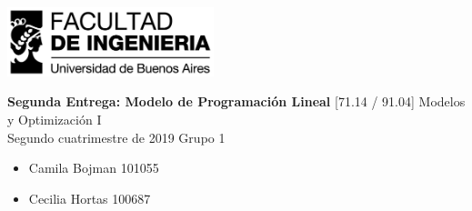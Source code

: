 \documentclass[a4paper]{article}
\newcommand{\materia}{[71.14 / 91.04] Modelos y Optimización I}
\newcommand{\trabajo}{Segunda Entrega: Modelo de Programación Lineal}
\newcommand{\cuatrimestre}{Segundo cuatrimestre de 2019}
\newcommand{\grupo}{Grupo 1}
\begin{document}
\setcounter{page}{1}
	
\begin{titlepage}
	\hfill\includegraphics[width=6cm]{fiuba.jpg}
    \begin{center}
    \vfill
    \Huge \textbf{\trabajo}
    \vskip2cm
    \Large \materia\\
    \cuatrimestre
    \vfill
    \grupo
	\begin{itemize}
		\item Camila Bojman 101055
		\item Cecilia Hortas 100687
	\end{itemize}
    \vskip1cm
    \end{center}
\end{titlepage}
\end{document}
